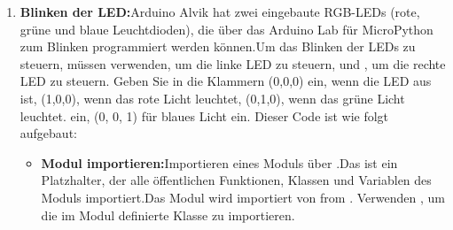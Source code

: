 \begin{enumerate}
	\item \textbf{Blinken der LED:}Arduino Alvik hat zwei eingebaute RGB-LEDs (rote, grüne und blaue Leuchtdioden), die über das Arduino Lab für MicroPython zum Blinken programmiert werden können.Um das Blinken der LEDs zu steuern, müssen  verwenden, um die linke LED zu steuern, und , um die rechte LED zu steuern. Geben Sie in die Klammern (0,0,0) ein, wenn die LED aus ist, (1,0,0), wenn das rote Licht leuchtet, (0,1,0), wenn das grüne Licht leuchtet. ein, (0, 0, 1) für blaues Licht ein.
	{
		\label{blinkcode}	
		{	\pythonstyle
			}
	}
	Dieser Code ist wie folgt aufgebaut:
	\begin{itemize}
		\item \textbf{Modul importieren:}Importieren eines  Moduls über .Das \PYTHON{*} ist ein Platzhalter, der alle öffentlichen Funktionen, Klassen und Variablen des Moduls importiert.Das Modul  wird importiert von from . Verwenden , um die im Modul definierte Klasse  zu importieren.

\end{itemize}
\end{enumerate}

